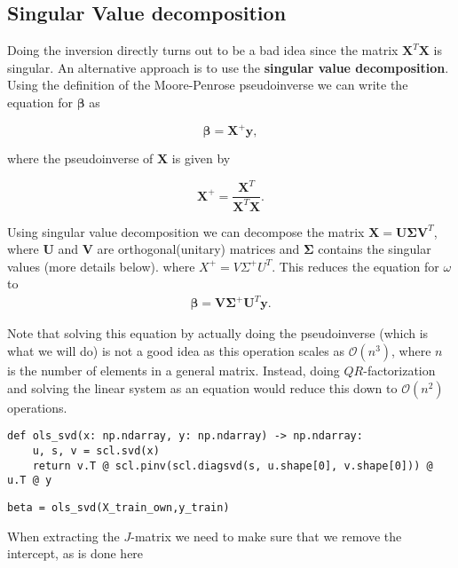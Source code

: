 \documentclass[%
oneside,                 %
final,                   %
10pt]{article}
\begin{document}
\subsection*{Singular Value decomposition}

Doing the inversion directly turns out to be a bad idea since the matrix
$\bm{X}^T\bm{X}$ is singular. An alternative approach is to use the \textbf{singular
value decomposition}. Using the definition of the Moore-Penrose
pseudoinverse we can write the equation for $\bm{\beta}$ as

\[
    \bm{\beta} = \bm{X}^{+}\bm{y},
\]

where the pseudoinverse of $\bm{X}$ is given by

\[
    \bm{X}^{+} = \frac{\bm{X}^T}{\bm{X}^T\bm{X}}.
\]

Using singular value decomposition we can decompose the matrix  $\bm{X} = \bm{U}\bm{\Sigma} \bm{V}^T$,
where $\bm{U}$ and $\bm{V}$ are orthogonal(unitary) matrices and $\bm{\Sigma}$ contains the singular values (more details below).
where $X^{+} = V\Sigma^{+} U^T$. This reduces the equation for
$\omega$ to
\begin{align}
    \bm{\beta} = \bm{V}\bm{\Sigma}^{+} \bm{U}^T \bm{y}.
\end{align}

Note that solving this equation by actually doing the pseudoinverse
(which is what we will do) is not a good idea as this operation scales
as $\mathcal{O}(n^3)$, where $n$ is the number of elements in a
general matrix. Instead, doing $QR$-factorization and solving the
linear system as an equation would reduce this down to
$\mathcal{O}(n^2)$ operations.


\begin{verbatim}
def ols_svd(x: np.ndarray, y: np.ndarray) -> np.ndarray:
    u, s, v = scl.svd(x)
    return v.T @ scl.pinv(scl.diagsvd(s, u.shape[0], v.shape[0])) @ u.T @ y
\end{verbatim}

\begin{verbatim}
beta = ols_svd(X_train_own,y_train)
\end{verbatim}

When extracting the $J$-matrix  we need to make sure that we remove the intercept, as is done here
\end{document}
